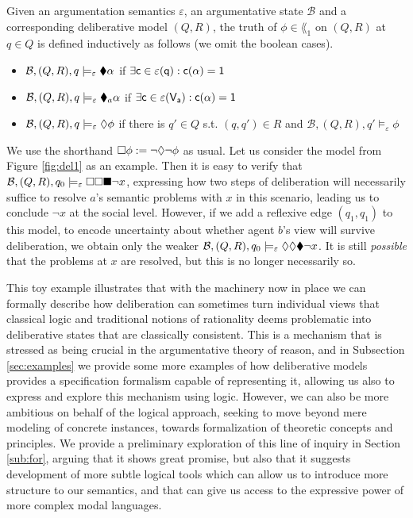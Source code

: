 \documentclass[greybox]{svmult}
\newcommand{\clab}{\sf c}
\newcommand{\views}{\mathcal B}
\newcommand{\sem}{\varepsilon}
\begin{document}
\begin{definition}\label{truth1}
Given an argumentation semantics $\sem$, an argumentative state $\views$ and a corresponding deliberative model $(Q,R)$, the truth of $\phi \in \lang_1$ on $(Q,R)$ at $q \in Q$ is defined inductively as follows (we omit the boolean cases).
\begin{itemize}
\item $\views, (Q,R),q\models_\sem \cdia \alpha$ if $\exists \clab \in \sem(q): \overline \clab(\alpha) = 1$
\item $\views,(Q,R),q\models_\sem \cdia_a \alpha$ if $\exists \clab \in \sem(V_a): \overline \clab(\alpha) = 1$
\item $\views,(Q,R),q \models_\sem \adia \phi$ if there is $q' \in Q$ s.t. $(q,q') \in R$ and $\views,(Q,R),q' \models_\sem \phi$
\end{itemize}
\end{definition}
 
We use the shorthand $\square \phi := \neg \lozenge \neg \phi$ as usual. Let us consider the model from Figure \ref{fig:del1} as an example. Then it is easy to verify that $\views, (Q,R), q_0 \models_\sem \abox \abox \cbox \neg x$, expressing how two steps of deliberation will necessarily suffice to resolve $a$'s semantic problems with $x$ in this scenario, leading us to conclude $\neg x$ at the social level. However, if we add a reflexive edge $(q_1,q_1)$ to this model, to encode uncertainty about whether agent $b$'s view will survive deliberation, we obtain only the weaker $\views, (Q,R),q_0 \models_\sem \adia \adia \cdia \neg x$. It is still \emph{possible} that the problems at $x$ are resolved, but this is no longer necessarily so.

This toy example illustrates that with the machinery now in place we can formally describe how deliberation can sometimes turn individual views that classical logic and traditional notions of rationality deems problematic into deliberative states that are classically consistent. This is a mechanism that is stressed as being crucial in the argumentative theory of reason, and in Subsection \ref{sec:examples} we provide some more examples of how deliberative models provides a specification formalism capable of representing it, allowing us also to express and explore this mechanism using logic. However, we can also be more ambitious on behalf of the logical approach, seeking to move beyond mere modeling of concrete instances, towards formalization of theoretic concepts and principles. We provide a preliminary exploration of this line of inquiry in Section \ref{sub:for}, arguing that it shows great promise, but also that it suggests development of more subtle logical tools which can allow us to introduce more structure to our semantics, and that can give us access to the expressive power of more complex modal languages. 
\end{document}
